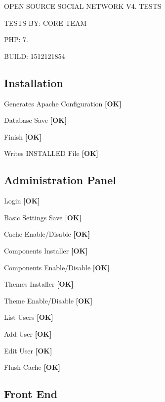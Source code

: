 O\+P\+EN S\+O\+U\+R\+CE S\+O\+C\+I\+AL N\+E\+T\+W\+O\+RK V4. T\+E\+S\+TS

T\+E\+S\+TS BY\+: C\+O\+RE T\+E\+AM

P\+HP\+: 7.

B\+U\+I\+LD\+: 1512121854

\subsection*{Installation}


\begin{DoxyItemize}
\item Generates Apache Configuration {\bfseries {\bfseries \mbox{[}OK\mbox{]}}}
\item Database Save {\bfseries \mbox{[}OK\mbox{]}}
\item Finish {\bfseries \mbox{[}OK\mbox{]}}
\item Writes I\+N\+S\+T\+A\+L\+L\+ED File {\bfseries \mbox{[}OK\mbox{]}}
\end{DoxyItemize}

\subsection*{Administration Panel}


\begin{DoxyItemize}
\item Login {\bfseries \mbox{[}OK\mbox{]}}
\item Basic Settings Save {\bfseries \mbox{[}OK\mbox{]}}
\item Cache Enable/\+Disable {\bfseries \mbox{[}OK\mbox{]}}
\item Components Installer {\bfseries \mbox{[}OK\mbox{]}}
\item Components Enable/\+Disable {\bfseries \mbox{[}OK\mbox{]}}
\item Themes Installer {\bfseries \mbox{[}OK\mbox{]}}
\item Theme Enable/\+Disable {\bfseries \mbox{[}OK\mbox{]}}
\item List Users {\bfseries \mbox{[}OK\mbox{]}}
\item Add User {\bfseries \mbox{[}OK\mbox{]}}
\item Edit User {\bfseries \mbox{[}OK\mbox{]}}
\item Flush Cache {\bfseries \mbox{[}OK\mbox{]}}
\end{DoxyItemize}

\subsection*{Front End}

